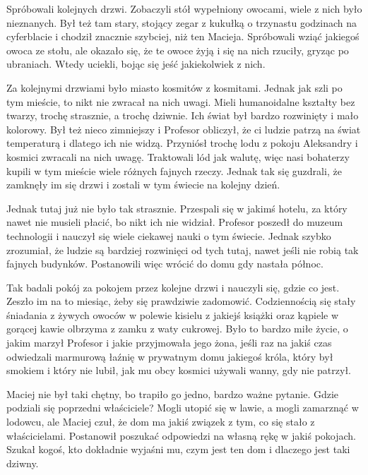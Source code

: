 Spróbowali kolejnych drzwi. Zobaczyli stół wypełniony owocami, wiele z nich było nieznanych.
Był też tam stary, stojący zegar z kukułką o trzynastu godzinach na cyferblacie i chodził znacznie szybciej, niż ten Macieja. Spróbowali wziąć jakiegoś owoca ze stołu, ale okazało się, że te owoce żyją i się na nich rzuciły, gryząc po ubraniach. 
Wtedy uciekli, bojąc się jeść jakiekolwiek z nich.

Za kolejnymi drzwiami było miasto kosmitów z kosmitami.
Jednak jak szli po tym mieście, to nikt nie zwracał na nich uwagi.
Mieli humanoidalne kształty bez twarzy, trochę strasznie, a trochę dziwnie.
Ich świat był bardzo rozwinięty i mało kolorowy.
Był też nieco zimniejszy i Profesor obliczył, że ci ludzie patrzą na świat temperaturą i dlatego ich nie widzą. Przyniósł trochę lodu z pokoju Aleksandry i kosmici zwracali na nich uwagę.
Traktowali lód jak walutę, więc nasi bohaterzy kupili w tym mieście wiele różnych fajnych rzeczy.
Jednak tak się guzdrali, że zamknęły im się drzwi i zostali w tym świecie na kolejny dzień.

Jednak tutaj już nie było tak strasznie.
Przespali się w jakimś hotelu, za który nawet nie musieli płacić, bo nikt ich nie widział.
Profesor poszedł do muzeum technologii i nauczył się wiele ciekawej nauki o tym świecie.
Jednak szybko zrozumiał, że ludzie są bardziej rozwinięci od tych tutaj, nawet jeśli nie robią tak fajnych budynków. Postanowili więc wrócić do domu gdy nastała północ.

Tak badali pokój za pokojem przez kolejne drzwi i nauczyli się, gdzie co jest.
Zeszło im na to miesiąc, żeby się prawdziwie zadomowić.
Codziennością się stały śniadania z żywych owoców w polewie kisielu z jakiejś książki oraz kąpiele w gorącej kawie olbrzyma z zamku z waty cukrowej. Było to bardzo miłe życie, o jakim marzył Profesor i jakie przyjmowała jego żona, jeśli raz na jakiś czas odwiedzali marmurową łaźnię w prywatnym domu jakiegoś króla, który był smokiem i który nie lubił, jak mu obcy kosmici używali wanny, gdy nie patrzył.

\divider{}

Maciej nie był taki chętny, bo trapiło go jedno, bardzo ważne pytanie.
Gdzie podziali się poprzedni właściciele? 
Mogli utopić się w lawie, a mogli zamarznąć w lodowcu, ale Maciej czuł, że dom ma jakiś związek z tym, co się stało z właścicielami. Postanowił poszukać odpowiedzi na własną rękę w jakiś pokojach.
Szukał kogoś, kto dokładnie wyjaśni mu, czym jest ten dom i dlaczego jest taki dziwny.

